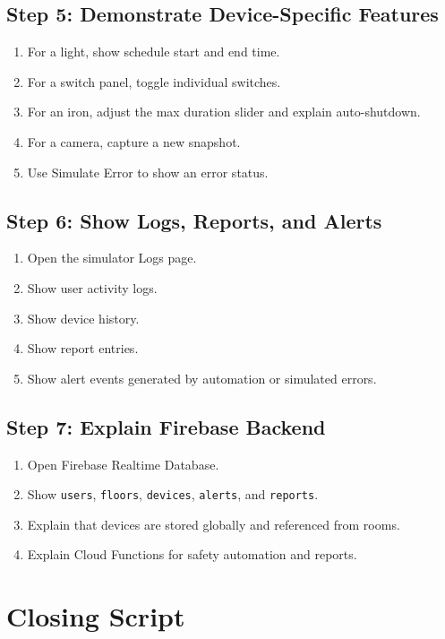 \documentclass[11pt,a4paper]{article}
\begin{document}
\subsection{Step 5: Demonstrate Device-Specific Features}
\begin{enumerate}
    \item For a light, show schedule start and end time.
    \item For a switch panel, toggle individual switches.
    \item For an iron, adjust the max duration slider and explain auto-shutdown.
    \item For a camera, capture a new snapshot.
    \item Use Simulate Error to show an error status.
\end{enumerate}

\subsection{Step 6: Show Logs, Reports, and Alerts}
\begin{enumerate}
    \item Open the simulator Logs page.
    \item Show user activity logs.
    \item Show device history.
    \item Show report entries.
    \item Show alert events generated by automation or simulated errors.
\end{enumerate}

\subsection{Step 7: Explain Firebase Backend}
\begin{enumerate}
    \item Open Firebase Realtime Database.
    \item Show \texttt{users}, \texttt{floors}, \texttt{devices}, \texttt{alerts}, and \texttt{reports}.
    \item Explain that devices are stored globally and referenced from rooms.
    \item Explain Cloud Functions for safety automation and reports.
\end{enumerate}

\section{Closing Script}
\end{document}
